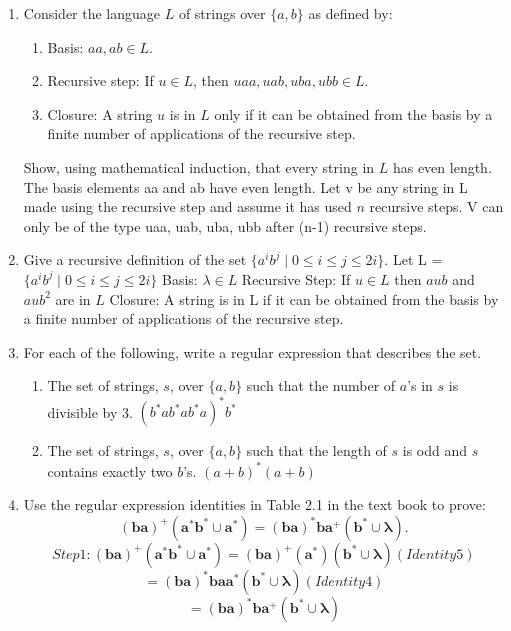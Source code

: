 \documentclass{article}
\begin{document}
\begin{enumerate}

\item Consider the language $L$ of strings over $\{a, b\}$ as defined
  by:
\begin{enumerate}
\item Basis: $aa, ab \in L$.
\item Recursive step: If $u \in L$, then $uaa, uab, uba, ubb \in L$.
\item Closure: A string $u$ is in $L$ only if it can be obtained from
  the basis by a finite number of applications of the recursive step.
\end{enumerate}
Show, using mathematical induction, that every string in $L$ has even
length.
\newline The basis elements aa and ab have even length. Let v be any string in L made using the recursive step and assume it has used $n$ recursive steps. V can only be of the type uaa, uab, uba, ubb after (n-1) recursive steps.

\item Give a recursive definition of the set $\{ a^ib^j \mid 0 \leq i
  \leq j \leq 2i \}$.
  \newline Let L = $\{ a^ib^j \mid 0 \leq i \leq j \leq 2i \}$
  \newline Basis: $\lambda \in L$ 
  \newline Recursive Step: If $u \in L$ then $aub$ and $aub^2$ are in $L$
  \newline Closure: A string is in L if it can be obtained from the basis by a finite number of applications of the recursive step.

  \item For each of the following, write a
  regular expression that describes the set.
\begin{enumerate}
\item The set of strings, $s$, over $\{a, b\}$ such that the number of
  $a$'s in $s$
  is divisible by 3.
  \newline $(b^*ab^*ab^*a)^*b^*$

\item The set of strings, $s$, over $\{a, b\}$ such that the length of
  $s$ is odd and $s$
  contains exactly two $b$'s.
  \newline $(a+b)^*(a+b)$

\end{enumerate}

\item Use the regular expression identities in Table 2.1 in the text
  book to prove:
\[
  \mathbf{(ba)^+(a^*b^* \cup a^*)} = \mathbf{(ba)^*ba^+(b^* \cup \lambda)}. 
\]
\[
  Step 1: \mathbf{(ba)^+(a^*b^* \cup a^*)} = \mathbf{(ba)^+(a^*)(b^* \cup \lambda)} (Identity 5)
\]
\[
  = \mathbf{(ba)^*baa^*(b^* \cup \lambda)} (Identity 4)
\]
\[
  = \mathbf{(ba)^*ba^+(b^* \cup \lambda)}
\]
 
\end{enumerate}
\end{document}
